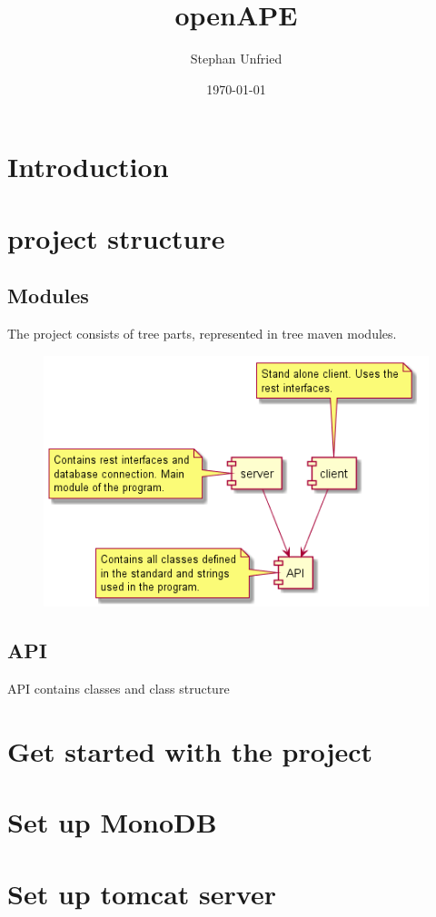 \documentclass[10pt]{article}
\title{openAPE}
\author{Stephan Unfried}
\date{\today}
\begin{document}
\maketitle
\newpage
\tableofcontents
\newpage
\section{Introduction}
\section{project structure}
\subsection{Modules}
The project consists of tree parts, represented in tree maven modules. 
\begin{figure}[ht]
\centering
\includegraphics[width=1\textwidth]{uml/modulesuml.png}
\end{figure}
\subsection{API}
API contains classes and class structure 
\section{Get started with the project}
\section{Set up MonoDB}
\section{Set up tomcat server}
\end{document}
